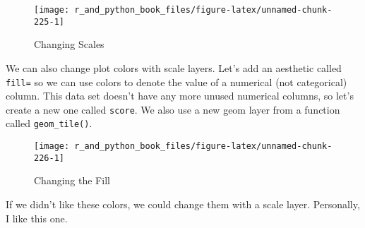 \documentclass[12pt,krantz2]{krantz}
\makeatletter
\newenvironment{Shaded}{\begin{snugshade}}{\end{snugshade}}
\newcommand{\DataTypeTok}[1]{\textcolor[rgb]{0.27,0.27,0.27}{#1}}
\newcommand{\DecValTok}[1]{\textcolor[rgb]{0.06,0.06,0.06}{#1}}
\newcommand{\KeywordTok}[1]{\textcolor[rgb]{0.27,0.27,0.27}{\textbf{#1}}}
\newcommand{\NormalTok}[1]{#1}
\newcommand{\OperatorTok}[1]{\textcolor[rgb]{0.43,0.43,0.43}{\textbf{#1}}}
\newcommand{\StringTok}[1]{\textcolor[rgb]{0.5,0.5,0.5}{#1}}
\newenvironment{kframe}{%
\medskip{}
\setlength{\fboxsep}{.8em}
 \def\at@end@of@kframe{}%
 \ifinner\ifhmode%
  \def\at@end@of@kframe{\end{minipage}}%
  \begin{minipage}{\columnwidth}%
 \fi\fi%
 \def\FrameCommand##1{\hskip\@totalleftmargin \hskip-\fboxsep
 \colorbox{shadecolor}{##1}\hskip-\fboxsep
     \hskip-\linewidth \hskip-\@totalleftmargin \hskip\columnwidth}%
 \MakeFramed {\advance\hsize-\width
   \@totalleftmargin\z@ \linewidth\hsize
   \@setminipage}}%
 {\par\unskip\endMakeFramed%
 \at@end@of@kframe}
\renewenvironment{Shaded}{\begin{kframe}}{\end{kframe}}
\makeatother
\begin{document}
\begin{figure}

{\centering \texttt{[image: r\_and\_python\_book\_files/figure-latex/unnamed-chunk-225-1]} 

}

\caption{Changing Scales}\label{fig:unnamed-chunk-225}
\end{figure}

We can also change plot colors with scale layers. Let's add an aesthetic called \texttt{fill=} so we can use colors to denote the value of a numerical (not categorical) column. This data set doesn't have any more unused numerical columns, so let's create a new one called \texttt{score}. We also use a new geom layer from a function called \texttt{geom\_tile()}.

\begin{Shaded}
\end{Shaded}

\begin{figure}

{\centering \texttt{[image: r\_and\_python\_book\_files/figure-latex/unnamed-chunk-226-1]} 

}

\caption{Changing the Fill}\label{fig:unnamed-chunk-226}
\end{figure}

If we didn't like these colors, we could change them with a scale layer. Personally, I like this one.

\begin{Shaded}
\end{Shaded}
\end{document}

